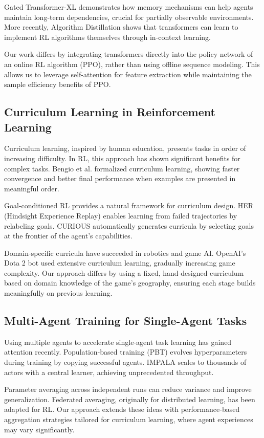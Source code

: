 \documentclass[12pt,a4paper]{article}
\begin{document}
Gated Transformer-XL demonstrates how memory mechanisms can help agents maintain long-term dependencies, crucial for partially observable environments. More recently, Algorithm Distillation shows that transformers can learn to implement RL algorithms themselves through in-context learning.

Our work differs by integrating transformers directly into the policy network of an online RL algorithm (PPO), rather than using offline sequence modeling. This allows us to leverage self-attention for feature extraction while maintaining the sample efficiency benefits of PPO.

\subsection{Curriculum Learning in Reinforcement Learning}

Curriculum learning, inspired by human education, presents tasks in order of increasing difficulty. In RL, this approach has shown significant benefits for complex tasks. Bengio et al. formalized curriculum learning, showing faster convergence and better final performance when examples are presented in meaningful order.

Goal-conditioned RL provides a natural framework for curriculum design. HER (Hindsight Experience Replay) enables learning from failed trajectories by relabeling goals. CURIOUS automatically generates curricula by selecting goals at the frontier of the agent's capabilities.

Domain-specific curricula have succeeded in robotics and game AI. OpenAI's Dota 2 bot used extensive curriculum learning, gradually increasing game complexity. Our approach differs by using a fixed, hand-designed curriculum based on domain knowledge of the game's geography, ensuring each stage builds meaningfully on previous learning.

\subsection{Multi-Agent Training for Single-Agent Tasks}

Using multiple agents to accelerate single-agent task learning has gained attention recently. Population-based training (PBT) evolves hyperparameters during training by copying successful agents. IMPALA scales to thousands of actors with a central learner, achieving unprecedented throughput.

Parameter averaging across independent runs can reduce variance and improve generalization. Federated averaging, originally for distributed learning, has been adapted for RL. Our approach extends these ideas with performance-based aggregation strategies tailored for curriculum learning, where agent experiences may vary significantly.
\end{document}
